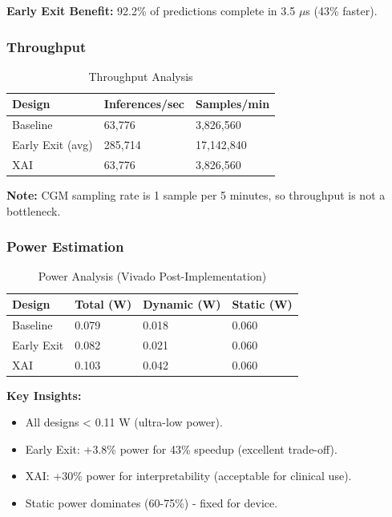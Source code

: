 \documentclass[11pt, a4paper]{article}
\begin{document}
\textbf{Early Exit Benefit:} 92.2\% of predictions complete in 3.5 $\mu$s (43\% faster).

\subsubsection{Throughput}

\begin{table}[H]
\centering
\caption{Throughput Analysis}
\label{tab:throughput}
\begin{tabular}{@{}lll@{}}
\toprule
\textbf{Design} & \textbf{Inferences/sec} & \textbf{Samples/min} \\ \midrule
Baseline & 63,776 & 3,826,560 \\
Early Exit (avg) & 285,714 & 17,142,840 \\
XAI & 63,776 & 3,826,560 \\ \bottomrule
\end{tabular}
\end{table}

\textbf{Note:} CGM sampling rate is 1 sample per 5 minutes, so throughput is not a bottleneck.

\subsubsection{Power Estimation}

\begin{table}[H]
\centering
\caption{Power Analysis (Vivado Post-Implementation)}
\label{tab:power}
\begin{tabular}{@{}llll@{}}
\toprule
\textbf{Design} & \textbf{Total (W)} & \textbf{Dynamic (W)} & \textbf{Static (W)} \\ \midrule
Baseline & 0.079 & 0.018 & 0.060 \\
Early Exit & 0.082 & 0.021 & 0.060 \\
XAI & 0.103 & 0.042 & 0.060 \\ \bottomrule
\end{tabular}
\end{table}

\textbf{Key Insights:}
\begin{itemize}
    \item All designs < 0.11 W (ultra-low power).
    \item Early Exit: +3.8\% power for 43\% speedup (excellent trade-off).
    \item XAI: +30\% power for interpretability (acceptable for clinical use).
    \item Static power dominates (60-75\%) - fixed for device.
\end{itemize}
\end{document}
